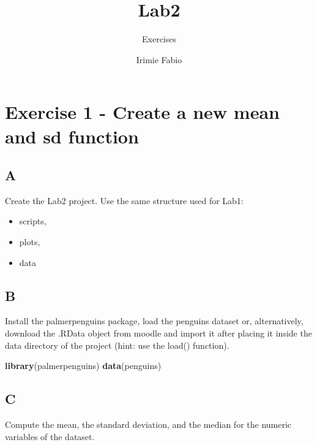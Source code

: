 \documentclass[
]{article}
\title{Lab2}
\subtitle{Exercises}
\author{Irimie Fabio}
\date{}
\newenvironment{Shaded}{\begin{snugshade}}{\end{snugshade}}
\newcommand{\FunctionTok}[1]{\textcolor[rgb]{0.13,0.29,0.53}{\textbf{#1}}}
\newcommand{\NormalTok}[1]{#1}
\providecommand{\tightlist}{%
  \setlength{\itemsep}{0pt}\setlength{\parskip}{0pt}}
\begin{document}
\maketitle

{
\setcounter{tocdepth}{2}
\tableofcontents
}
\hypertarget{exercise-1---create-a-new-mean-and-sd-function}{%
\section{Exercise 1 - Create a new mean and sd
function}\label{exercise-1---create-a-new-mean-and-sd-function}}

\hypertarget{a}{%
\subsection{A}\label{a}}

Create the Lab2 project. Use the same structure used for Lab1:

\begin{itemize}
\tightlist
\item
  scripts,
\item
  plots,
\item
  data
\end{itemize}

\hypertarget{b}{%
\subsection{B}\label{b}}

Install the palmerpenguins package, load the penguins dataset or,
alternatively, download the .RData object from moodle and import it
after placing it inside the data directory of the project (hint: use the
load() function).

\begin{Shaded}
\begin{Highlighting}[]
\FunctionTok{library}\NormalTok{(palmerpenguins)}
\FunctionTok{data}\NormalTok{(penguins)}
\end{Highlighting}
\end{Shaded}

\hypertarget{c}{%
\subsection{C}\label{c}}

Compute the mean, the standard deviation, and the median for the numeric
variables of the dataset.
\end{document}
